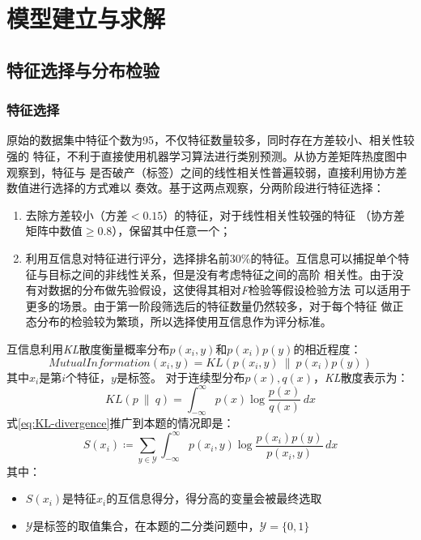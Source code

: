 \section{模型建立与求解}
\subsection{特征选择与分布检验}
\subsubsection{特征选择}
原始的数据集中特征个数为95，不仅特征数量较多，同时存在方差较小、相关性较强的
特征，不利于直接使用机器学习算法进行类别预测。从协方差矩阵热度图中观察到，特征与
是否破产（标签）之间的线性相关性普遍较弱，直接利用协方差数值进行选择的方式难以
奏效。基于这两点观察，分两阶段进行特征选择：
\begin{enumerate}
    \item 去除方差较小（方差$<0.15$）的特征，对于线性相关性较强的特征
    （协方差矩阵中数值$\geq 0.8$），保留其中任意一个；
    \item 利用互信息对特征进行评分，选择排名前30\%的特征。互信息可以捕捉单个特征与目标之间的非线性关系，但是没有考虑特征之间的高阶
    相关性。由于没有对数据的分布做先验假设，这使得其相对\textit{F}检验等假设检验方法
    可以适用于更多的场景。由于第一阶段筛选后的特征数量仍然较多，对于每个特征
    做正态分布的检验较为繁琐，所以选择使用互信息作为评分标准。
\end{enumerate}
互信息利用\textit{KL}散度衡量概率分布$p(x_i, y)$和$p(x_i)p(y)$的相近程度：
\begin{equation*}
MutualInformation(x_i,y) = KL(p(x_i, y) \ \| \ p(x_i)p(y))
\end{equation*}
其中$x_i$是第$i$个特征，$y$是标签。
对于连续型分布$p(x),q(x)$，\textit{KL}散度表示为：
\begin{equation}
    KL(p\ \|\ q)=\int_{-\infty}^{\infty} p(x)\log\frac{p(x)}{q(x)} \,dx 
    \label{eq:KL-divergence}
\end{equation}
式\ref{eq:KL-divergence}推广到本题的情况即是：
\begin{equation}
S(x_i)\coloneqq 
\sum\limits_{y\in\mathcal{Y}} 
\int_{-\infty}^{\infty} p(x_i,y)\log\frac{p(x_i)p(y)}{p(x_i,y)} \,dx 
    \label{eq:score-mutual-information}
\end{equation}
其中：
\begin{itemize}
    \item $S(x_i)$是特征$x_i$的互信息得分，得分高的变量会被最终选取
    \item $\mathcal{Y}$是标签的取值集合，在本题的二分类问题中，$\mathcal{Y}=\{0,1\}$
\end{itemize}
